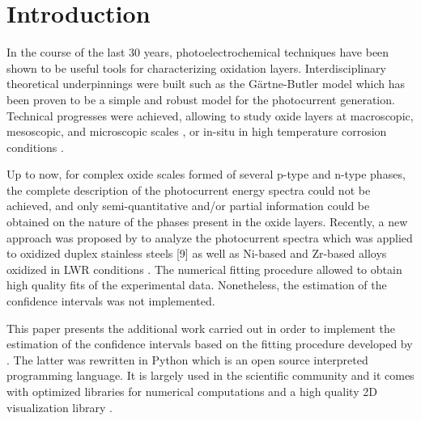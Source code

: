 \section{Introduction}

In the course of the last 30 years, photoelectrochemical techniques have been 
shown to be useful tools for characterizing oxidation layers. 
Interdisciplinary theoretical underpinnings were built 
\citep{morrison1980, vijh1969, stimming1986, diquarto1997, wouters2007} 
such as the Gärtne-Butler model \citep{gartner1959,butler1977} which has been 
proven to be a simple and robust model for the photocurrent generation. 
Technical progresses were achieved, allowing to study oxide layers at 
macroscopic, mesoscopic, and microscopic scales 
\citep{benaboud2007, srisrual2011}, or in-situ in high temperature corrosion 
conditions \citep{bojinov2002,skocic2016}.

Up to now, for complex oxide scales formed of several p-type and n-type phases, 
the complete description of the photocurrent energy spectra could not be achieved, 
and only semi-quantitative and/or partial information could be obtained on the 
nature of the phases present in the oxide layers. Recently, a new approach was 
proposed by \citet{petit2013} to analyze the photocurrent spectra which was 
applied to oxidized duplex stainless steels [9] as well as Ni-based and 
Zr-based alloys oxidized in LWR conditions \citep{skocic2016}. 
The numerical fitting procedure allowed to obtain high quality fits of the 
experimental data. Nonetheless, the estimation of the confidence intervals 
was not implemented.

This paper presents the additional work carried out in order to implement the 
estimation of the confidence intervals based on the fitting procedure 
developed by \citet{petit2013}. The latter was rewritten in Python which is 
an open source interpreted programming language. It is largely used in the 
scientific community \citep{langtangen2012, millman2011, kiusalaas2010, oliphant2007} 
and it comes with optimized libraries for numerical computations 
\citep{vanderwalt2011,jones2020} and a high quality 2D visualization library \citep{hunter2007}.
